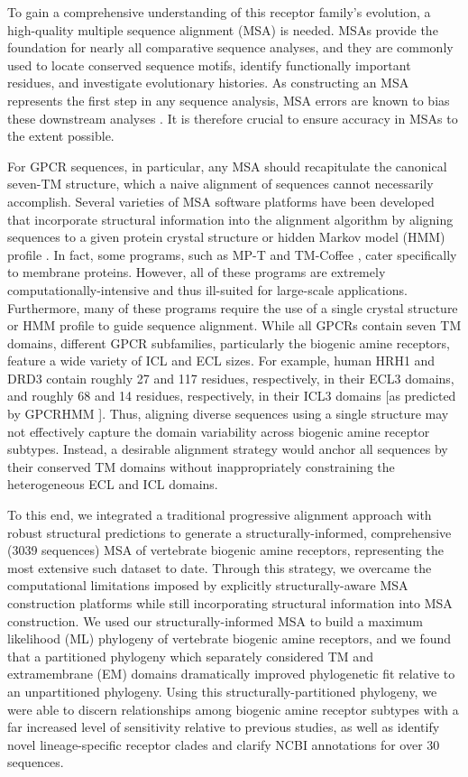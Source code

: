 \documentclass[fleqn,10pt]{wlpeerj}
\begin{document}
To gain a comprehensive understanding of this receptor family's evolution, a high-quality multiple sequence alignment (MSA) is needed. MSAs provide the foundation for nearly all comparative sequence analyses, and they are commonly used to locate conserved sequence motifs, identify functionally important residues, and investigate evolutionary histories. As constructing an MSA represents the first step in any sequence analysis, MSA errors are known to bias these downstream analyses \citep{Ogden2006, Wong2008, Jordan2012}. It is therefore crucial to ensure accuracy in MSAs to the extent possible. 

For GPCR sequences, in particular, any MSA should recapitulate the canonical seven-TM structure, which a naive alignment of sequences cannot necessarily accomplish. Several varieties of MSA software platforms have been developed that incorporate structural information into the alignment algorithm by aligning sequences to a given protein crystal structure \citep{promals3d, 3dcoffee} or hidden Markov model (HMM) profile \citep{hmmer, Chang2012, Hill2012}. In fact, some programs, such as MP-T \citep{Hill2012} and TM-Coffee \citep{Chang2012}, cater specifically to membrane proteins. However, all of these programs are extremely computationally-intensive and thus ill-suited for large-scale applications. Furthermore, many of these programs require the use of a single crystal structure or HMM profile to guide sequence alignment. While all GPCRs contain seven TM domains, different GPCR subfamilies, particularly the biogenic amine receptors, feature a wide variety of ICL and ECL sizes. For example, human HRH1 and DRD3 contain roughly 27 and 117 residues, respectively, in their ECL3 domains, and roughly 68 and 14 residues, respectively, in their ICL3 domains [as predicted by GPCRHMM \citep{Wistrand2006}]. Thus, aligning diverse sequences using a single structure may not effectively capture the domain variability across biogenic amine receptor subtypes. Instead, a desirable alignment strategy would anchor all sequences by their conserved TM domains without inappropriately constraining the heterogeneous ECL and ICL domains.

To this end, we integrated a traditional progressive alignment approach with robust structural predictions to generate a structurally-informed, comprehensive (3039 sequences) MSA of vertebrate biogenic amine receptors, representing the most extensive such dataset to date. Through this strategy,  we overcame the computational limitations imposed by explicitly structurally-aware MSA construction platforms while still incorporating structural information into MSA construction. We used our structurally-informed MSA to build a maximum likelihood (ML) phylogeny of vertebrate biogenic amine receptors, and we found that a partitioned phylogeny which separately considered TM and extramembrane (EM) domains dramatically improved phylogenetic fit relative to an unpartitioned phylogeny. Using this structurally-partitioned phylogeny, we were able to discern relationships among biogenic amine receptor subtypes with a far increased level of sensitivity relative to previous studies, as well as identify novel lineage-specific receptor clades and clarify NCBI annotations for over 30 sequences.
\end{document}
